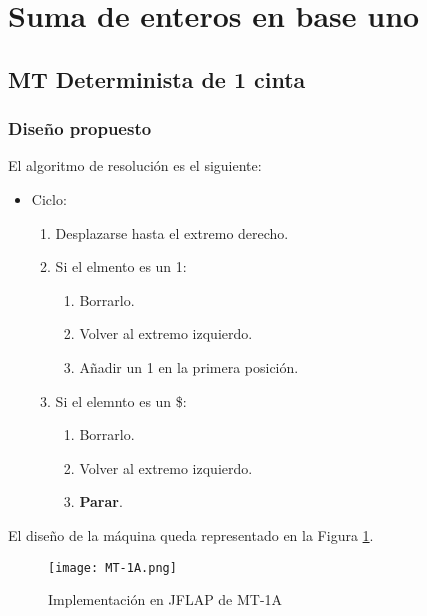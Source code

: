 \section{Suma de enteros en base uno}


\subsection{MT Determinista de 1 cinta}

\subsubsection*{Diseño propuesto}
El algoritmo de resolución es el siguiente:

\begin{itemize}
    \item Ciclo:
    \begin{enumerate}[1.]
        \item Desplazarse hasta el extremo derecho.
        \item Si el elmento es un 1:
        \begin{enumerate}[1.]
            \item Borrarlo.
            \item Volver al extremo izquierdo.
            \item Añadir un 1 en la primera posición.
        \end{enumerate}
        \item Si el elemnto es un \$:
        \begin{enumerate}[1.]
            \item Borrarlo.
            \item Volver al extremo izquierdo.
            \item \textbf{Parar}.
        \end{enumerate}
    \end{enumerate}
\end{itemize}

El diseño de la máquina queda representado en la Figura \ref{fig:MT-1A}.

\begin{figure}[h]
    \centering
    \texttt{[image: MT-1A.png]}
    \caption{Implementación en JFLAP de MT-1A}
    \label{fig:MT-1A}
\end{figure}



